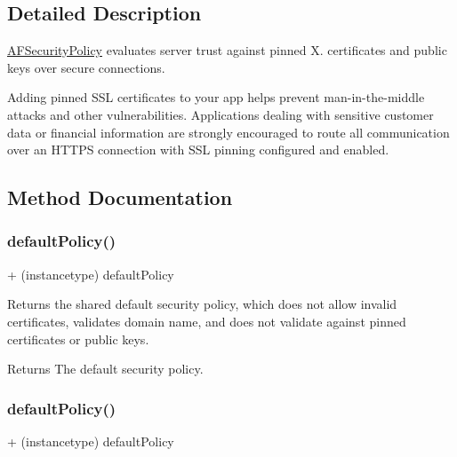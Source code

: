 \subsection{Detailed Description}
{\ttfamily \mbox{\hyperlink{interface_a_f_security_policy}{A\+F\+Security\+Policy}}} evaluates server trust against pinned X. certificates and public keys over secure connections.

Adding pinned S\+SL certificates to your app helps prevent man-\/in-\/the-\/middle attacks and other vulnerabilities. Applications dealing with sensitive customer data or financial information are strongly encouraged to route all communication over an H\+T\+T\+PS connection with S\+SL pinning configured and enabled. 

\subsection{Method Documentation}
\mbox{\label{interface_a_f_security_policy_aa63c18e904ef6e42761b7c20a1af2f3f}} 
\subsubsection{\texorpdfstring{default\+Policy()}{defaultPolicy()}\hspace{0.1cm}{\footnotesize\ttfamily [1/3]}}
{\footnotesize\ttfamily + (instancetype) default\+Policy \begin{DoxyParamCaption}{ }\end{DoxyParamCaption}}

Returns the shared default security policy, which does not allow invalid certificates, validates domain name, and does not validate against pinned certificates or public keys.

\begin{DoxyReturn}{Returns}
The default security policy. 
\end{DoxyReturn}
\mbox{\label{interface_a_f_security_policy_aa63c18e904ef6e42761b7c20a1af2f3f}} 
\subsubsection{\texorpdfstring{default\+Policy()}{defaultPolicy()}\hspace{0.1cm}{\footnotesize\ttfamily [2/3]}}
{\footnotesize\ttfamily + (instancetype) default\+Policy \begin{DoxyParamCaption}{ }\end{DoxyParamCaption}}

